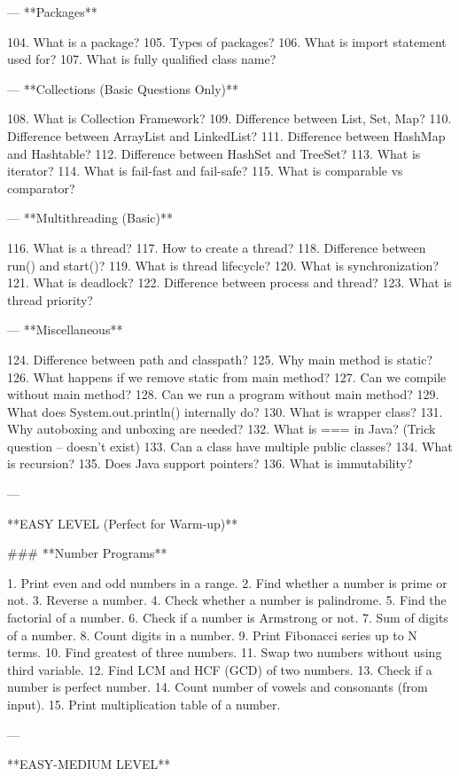 ---
 **Packages**

104. What is a package?
105. Types of packages?
106. What is import statement used for?
107. What is fully qualified class name?

---
 **Collections (Basic Questions Only)**

108. What is Collection Framework?
109. Difference between List, Set, Map?
110. Difference between ArrayList and LinkedList?
111. Difference between HashMap and Hashtable?
112. Difference between HashSet and TreeSet?
113. What is iterator?
114. What is fail-fast and fail-safe?
115. What is comparable vs comparator?

---
 **Multithreading (Basic)**

116. What is a thread?
117. How to create a thread?
118. Difference between run() and start()?
119. What is thread lifecycle?
120. What is synchronization?
121. What is deadlock?
122. Difference between process and thread?
123. What is thread priority?

---
 **Miscellaneous**

124. Difference between path and classpath?
125. Why main method is static?
126. What happens if we remove static from main method?
127. Can we compile without main method?
128. Can we run a program without main method?
129. What does System.out.println() internally do?
130. What is wrapper class?
131. Why autoboxing and unboxing are needed?
132. What is === in Java? (Trick question – doesn’t exist)
133. Can a class have multiple public classes?
134. What is recursion?
135. Does Java support pointers?
136. What is immutability?


---

 **EASY LEVEL (Perfect for Warm-up)**

### **Number Programs**

1. Print even and odd numbers in a range.
2. Find whether a number is prime or not.
3. Reverse a number.
4. Check whether a number is palindrome.
5. Find the factorial of a number.
6. Check if a number is Armstrong or not.
7. Sum of digits of a number.
8. Count digits in a number.
9. Print Fibonacci series up to N terms.
10. Find greatest of three numbers.
11. Swap two numbers without using third variable.
12. Find LCM and HCF (GCD) of two numbers.
13. Check if a number is perfect number.
14. Count number of vowels and consonants (from input).
15. Print multiplication table of a number.

---

 **EASY-MEDIUM LEVEL**

